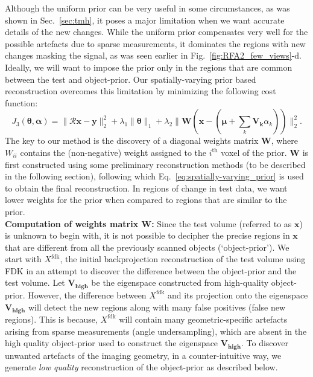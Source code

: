 \documentclass[journal]{IEEEtran}
\begin{document}
Although the uniform prior can be very useful in some
circumstances, as was shown in Sec.~\ref{sec:tmh}, it poses a major
limitation when we want accurate details of the new changes. While the
uniform prior compensates very well for the possible artefacts due to
sparse measurements, it dominates the regions with new changes masking
the signal, as was seen earlier in Fig.~\ref{fig:RFA2_few_views}-d. Ideally, we
will want to impose the prior only in the regions that are common
between the test and object-prior.  Our spatially-varying prior based
reconstruction overcomes this limitation by minimizing the following
cost function:
\begin{equation}
J_3(\boldsymbol{\theta},\boldsymbol{\alpha}) = \lVert\boldsymbol{\mathcal{R} x}-\boldsymbol{y}\rVert_2^2  + \lambda_1\lVert\boldsymbol{\theta}\rVert_1 +\lambda_2\lVert\boldsymbol{W}(\boldsymbol{x} - (\boldsymbol{\mu} + \sum_{k}\boldsymbol{V_k}\alpha_k))\rVert_2^2.
\label{eq:spatially-varying_prior}
\end{equation}
The key to our method is the discovery of a diagonal weights
 matrix $\boldsymbol{W}$, where $W_{ii}$ contains the (non-negative) weight assigned to the $i^{\textrm{th}}$ voxel of the prior. $\boldsymbol{W}$ is first constructed using some preliminary reconstruction methods (to be described in the following section), following which Eq.~\ref{eq:spatially-varying_prior} is used to obtain the final reconstruction. In regions of change in test data, we want lower weights for the prior when compared to regions that are similar to the prior.  
 \\
 
\textbf{Computation of weights matrix $\boldsymbol{W}$:}
Since the test volume (referred to as $\boldsymbol{x}$) is unknown to
begin with, it is not possible to decipher the precise regions in
$\boldsymbol{x}$ that are different from all the previously scanned
objects (`object-prior'). We start with $X^{\text{fdk}}$, the initial
backprojection reconstruction of the test volume using FDK in an attempt to
discover the difference between the object-prior and the test
volume. Let $\boldsymbol{V_{\text{high}}}$ be the eigenspace
constructed from high-quality object-prior. However, the difference
between $X^{\text{fdk}}$ and its projection onto the eigenspace
$\boldsymbol{V_{\text{high}}}$ will detect the new regions along with
many false positives (false new regions). This is because,
$X^{\text{fdk}}$ will contain many geometric-specific artefacts
arising from sparse measurements (angle undersampling), which are
absent in the high quality object-prior used to construct the
eigenspace $\boldsymbol{V_{\text{high}}}$. To discover unwanted
artefacts of the imaging geometry, in a counter-intuitive way, we
generate \emph{low quality} reconstruction of the object-prior as
described below.
\\
\end{document}
